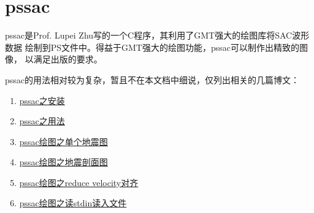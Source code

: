 \section{pssac}
\label{sec:pssac}

pssac是Prof. Lupei Zhu写的一个C程序，其利用了GMT强大的绘图库将SAC波形数据
绘制到PS文件中。得益于GMT强大的绘图功能，pssac可以制作出精致的图像，
以满足出版的要求。

pssac的用法相对较为复杂，暂且不在本文档中细说，仅列出相关的几篇博文：
\begin{enumerate}
\item \href{http://seisman.info/install-pssac.html}{pssac之安装}
\item \href{http://seisman.info/usage-of-pssac.html}{pssac之用法}
\item \href{http://seisman.info/plot-single-trace-with-pssac.html}{pssac绘图之单个地震图}
\item \href{http://seisman.info/plot-profile-with-pssac.html}{pssac绘图之地震剖面图}
\item \href{http://seisman.info/reduce-velocity-alignment-with-pssac.html}{pssac绘图之reduce velocity对齐}
\item \href{http://seisman.info/read-files-from-stdin-with-pssac.html}{pssac绘图之读stdin读入文件}
\end{enumerate}
